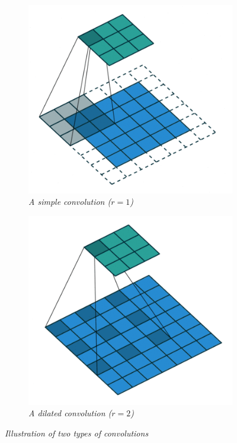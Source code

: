\documentclass{article}
\begin{document}
            \begin{figure}[!ht]
                \begin{subfigure}{.49\linewidth}
                    \centering
                    \includegraphics[width=.8\linewidth]{pics/conv-simple.png}
                    \caption{\textit{A simple convolution ($r=1$)}}
                    \label{fig:conv-simple}
                \end{subfigure}
                \begin{subfigure}{.49\linewidth}
                    \centering
                    \includegraphics[width=.8\linewidth]{pics/conv-dilated.png}
                    \caption{\textit{A dilated convolution ($r=2$)}}
                    \label{fig:conv-dilated}
                \end{subfigure}
                \caption{\textit{Illustration of two types of convolutions}}
            \end{figure}
\end{document}
